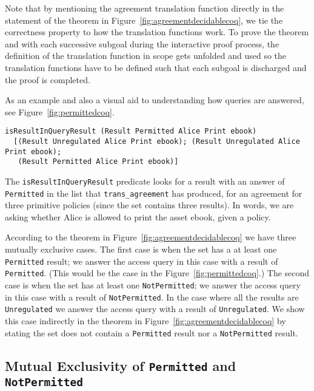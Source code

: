 \documentclass[conference]{IEEEtran}
\newcommand{\syn}{\texttt}
\begin{document}
Note that by mentioning the agreement translation function directly in the statement of the theorem in Figure~\ref{fig:agreementdecidablecoq}, we tie the correctness property to how the translation functions work. To prove the theorem and with each successive subgoal during the interactive proof process, the definition of the translation function in scope gets unfolded and used so the translation functions have to be defined such that each subgoal is discharged and the proof is completed. 


As an example and also a visual aid to understanding how queries are
answered, see Figure~\ref{fig:permittedcoq}.
%
\lstset{language=Coq, captionpos=b}
\begin{figure*}
\begin{lstlisting}
isResultInQueryResult (Result Permitted Alice Print ebook)
  [(Result Unregulated Alice Print ebook); (Result Unregulated Alice Print ebook);
   (Result Permitted Alice Print ebook)]
\end{lstlisting}
\caption{Access Request Resulting in Decision of \syn{Permitted}}
\label{fig:permittedcoq}
\end{figure*}
The \syn{isResultInQueryResult} predicate looks for a result with an
answer of \syn{Permitted} in the list that \syn{trans_agreement} has
produced, for an agreement for three primitive policies (since the set
contains three results). In words, we are asking whether Alice is
allowed to print the asset ebook, given a policy.
    
According to the theorem in Figure~\ref{fig:agreementdecidablecoq} we have three mutually exclusive cases. The first case is when the set has a at least one \syn{Permitted} result; we answer the access query in this case with a result of \syn{Permitted}. (This would be the case in the Figure~\ref{fig:permittedcoq}.) The second case is when the set has at least one \syn{NotPermitted}; we answer the access query in this case with a result of \syn{NotPermitted}. In the case where all the results are \syn{Unregulated} we answer the access query with a result of \syn{Unregulated}. We show this case indirectly in the theorem in Figure~\ref{fig:agreementdecidablecoq} by stating the set does not contain a \syn{Permitted} result nor a \syn{NotPermitted} result. 

\subsection{Mutual Exclusivity of \syn{Permitted} and \syn{NotPermitted}}\label{sec:mutualexclusive}
\end{document}
